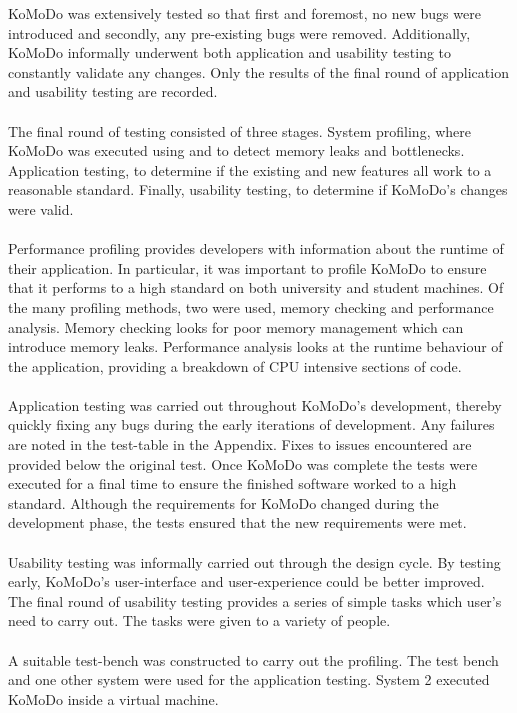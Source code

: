 KoMoDo was extensively tested so that first and foremost, no new bugs were introduced and secondly, any pre-existing bugs were removed. Additionally, KoMoDo informally underwent both application and usability testing to constantly validate any changes. Only the results of the final round of application and usability testing are recorded.\\\\
%
The final round of testing consisted of three stages. System profiling, where KoMoDo was executed using  and  to detect memory leaks and bottlenecks. Application testing, to determine if the existing and new features all work to a reasonable standard. Finally, usability testing, to determine if KoMoDo's changes were valid.\\\\
%
Performance profiling provides developers with information about the runtime of their application. In particular, it was important to profile KoMoDo to ensure that it performs to a high standard on both university and student machines. Of the many profiling methods, two were used, memory checking and performance analysis. Memory checking looks for poor memory management which can introduce memory leaks. Performance analysis looks at the runtime behaviour of the application, providing a breakdown of CPU intensive sections of code.\\\\
%
Application testing was carried out throughout KoMoDo's development, thereby quickly fixing any bugs during the early iterations of development. Any failures are noted in the test-table in the Appendix. Fixes to issues encountered are provided below the original test. Once KoMoDo was complete the tests were executed for a final time to ensure the finished software worked to a high standard. Although the requirements for KoMoDo changed during the development phase, the tests ensured that the new requirements were met.\\\\
%
Usability testing was informally carried out through the design cycle. By testing early, KoMoDo's user-interface and user-experience could be better improved. The final round of usability testing provides a series of simple tasks which user's need to carry out. The tasks were given to a variety of people.\\\\
%
A suitable test-bench was constructed to carry out the profiling. The test bench and one other system were used for the application testing. System 2 executed KoMoDo inside a virtual machine.\\\\
